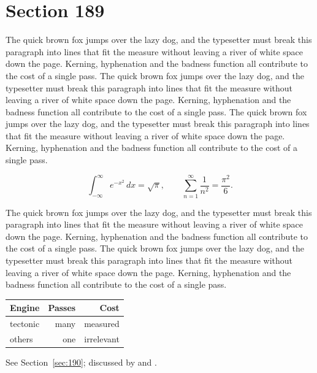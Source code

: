 \documentclass{article}
\begin{document}
\section{Section 189}
\label{sec:189}
The quick brown fox jumps over the lazy dog, and the typesetter must break this paragraph into lines that fit the measure without leaving a river of white space down the page. Kerning, hyphenation and the badness function all contribute to the cost of a single pass. The quick brown fox jumps over the lazy dog, and the typesetter must break this paragraph into lines that fit the measure without leaving a river of white space down the page. Kerning, hyphenation and the badness function all contribute to the cost of a single pass. The quick brown fox jumps over the lazy dog, and the typesetter must break this paragraph into lines that fit the measure without leaving a river of white space down the page. Kerning, hyphenation and the badness function all contribute to the cost of a single pass. 

\begin{equation}\label{eq:189}
\int_{-\infty}^{\infty} e^{-x^{2}}\,dx = \sqrt{\pi}, \qquad
\sum_{n=1}^{\infty} \frac{1}{n^{2}} = \frac{\pi^{2}}{6}.
\end{equation}

The quick brown fox jumps over the lazy dog, and the typesetter must break this paragraph into lines that fit the measure without leaving a river of white space down the page. Kerning, hyphenation and the badness function all contribute to the cost of a single pass. The quick brown fox jumps over the lazy dog, and the typesetter must break this paragraph into lines that fit the measure without leaving a river of white space down the page. Kerning, hyphenation and the badness function all contribute to the cost of a single pass. 

\begin{center}
\begin{tabular}{lrr}
\toprule
Engine & Passes & Cost \\
\midrule
tectonic & many & measured \\
others & one & irrelevant \\
\bottomrule
\end{tabular}
\end{center}

See Section~\ref{sec:190}; discussed by \textcite{k5} and \textcite{l2}.
\end{document}
